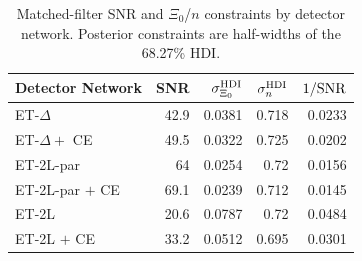 \begin{table}
\caption{Matched-filter SNR and $\Xi_0$/$n$ constraints by detector network. Posterior constraints are half-widths of the 68.27\% HDI.}
\label{tab:mcmc_modified_propagation_xi0_n_by_detector}
\begin{tabular}{lrrrr}
\toprule
Detector Network & SNR & $\sigma_{\Xi_0}^{\rm HDI}$ & $\sigma_n^{\rm HDI}$ & $1/{\rm SNR}$ \\
\midrule
ET-$\Delta$ & 42.9 & 0.0381 & 0.718 & 0.0233 \\
ET-$\Delta +$ CE & 49.5 & 0.0322 & 0.725 & 0.0202 \\
ET-2L-par & 64 & 0.0254 & 0.72 & 0.0156 \\
ET-2L-par $+$ CE & 69.1 & 0.0239 & 0.712 & 0.0145 \\
ET-2L & 20.6 & 0.0787 & 0.72 & 0.0484 \\
ET-2L $+$ CE & 33.2 & 0.0512 & 0.695 & 0.0301 \\
\bottomrule
\end{tabular}
\end{table}
